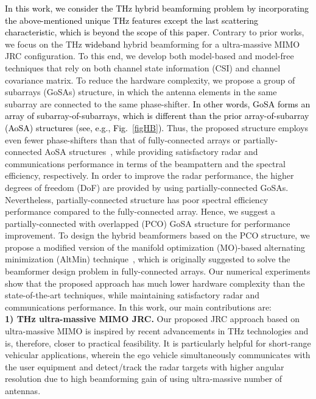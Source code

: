 \documentclass[journal,10pt]{IEEEtran}
\begin{document}
	
	\textcolor{black}{In this work, we consider the THz hybrid beamforming problem by incorporating the above-mentioned unique THz features except the last scattering characteristic, which is beyond the scope of this paper.} Contrary to prior works, we focus on the THz \textcolor{black}{wideband} hybrid beamforming for a ultra-massive MIMO JRC configuration. To this end, we develop both model-based and model-free techniques that rely on both channel state information (CSI) and channel covariance matrix. %
	To reduce the hardware complexity, we propose a group of subarrays (GoSAs) structure, in which the antenna elements in the same subarray are connected to the same phase-shifter. \textcolor{black}{In other words, GoSA forms an array of subarray-of-subarrays, which is different than the prior array-of-subarray (AoSA) structures (see, e.g., Fig.~\ref{figHB}).}  Thus, the proposed structure employs even fewer phase-shifters than that of fully-connected arrays or partially-connected  AoSA structures~\cite{ummimoComMagYeLi,ummimoGrapheneArray}, while providing satisfactory radar and communications performance in terms of the beampattern and the spectral efficiency, respectively. In order to improve the radar performance, the higher degrees of freedom (DoF) are provided by using partially-connected GoSAs. Nevertheless, partially-connected structure has poor spectral efficiency performance compared to the fully-connected array. Hence, we suggest a partially-connected with overlapped (PCO) GoSA structure for performance improvement. To design the hybrid beamformers based on the PCO structure, we propose a modified version of the manifold optimization (MO)-based alternating minimization (AltMin) technique~\cite{hybridBFAltMin}, which is originally suggested to solve the beamformer design problem in fully-connected arrays. Our numerical experiments show that the proposed approach has much lower hardware complexity than the state-of-the-art techniques, while maintaining satisfactory radar and communications performance. In this work, our main contributions are:\\
	\textbf{1) THz ultra-massive MIMO JRC.} Our proposed JRC approach based on ultra-massive MIMO is inspired by recent advancements in THz technologies and is, therefore, closer to practical feasibility. It is particularly helpful for short-range vehicular applications, wherein the ego vehicle simultaneously communicates with the user equipment and detect/track the radar targets with higher angular resolution due to high beamforming gain of using ultra-massive number of antennas. \\%
\end{document}
